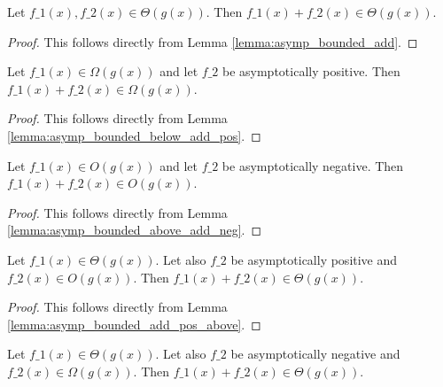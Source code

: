 \begin{lemma}
    \label{lemma:theta_add}
    \leanok
    Let $f\_1(x), f\_2(x) \in \Theta(g(x))$. Then $f\_1(x) + f\_2(x) \in \Theta(g(x))$.
\end{lemma}

\begin{proof}
    \leanok
    This follows directly from Lemma \ref{lemma:asymp_bounded_add}.
\end{proof}

\begin{lemma}
    \label{lemma:Omega_add_pos}
    \leanok
    Let $f\_1(x) \in \Omega(g(x))$ and let $f\_2$ be asymptotically positive. 
    Then $f\_1(x) + f\_2(x) \in \Omega(g(x))$.
\end{lemma}

\begin{proof}
    \leanok
    This follows directly from Lemma \ref{lemma:asymp_bounded_below_add_pos}.
\end{proof}

\begin{lemma}
    \label{lemma:O_add_neg}
    \leanok
    Let $f\_1(x) \in O(g(x))$ and let $f\_2$ be asymptotically negative. 
    Then $f\_1(x) + f\_2(x) \in O(g(x))$.
\end{lemma}

\begin{proof}
    \leanok
    This follows directly from Lemma \ref{lemma:asymp_bounded_above_add_neg}.
\end{proof}

\begin{lemma}
    \label{lemma:theta_add_pos_O}
    \leanok
    Let $f\_1(x) \in \Theta(g(x))$. Let also $f\_2$ be asymptotically positive and
    $f\_2(x) \in O(g(x))$. Then $f\_1(x) + f\_2(x) \in \Theta(g(x))$.
\end{lemma}

\begin{proof}
    \leanok
    This follows directly from Lemma \ref{lemma:asymp_bounded_add_pos_above}.
\end{proof}

\begin{lemma}
    \label{lemma:theta_add_neg_Omega}
    \leanok
    Let $f\_1(x) \in \Theta(g(x))$. Let also $f\_2$ be asymptotically negative
    and $f\_2(x) \in \Omega(g(x))$. Then $f\_1(x) + f\_2(x) \in \Theta(g(x))$.
\end{lemma}


